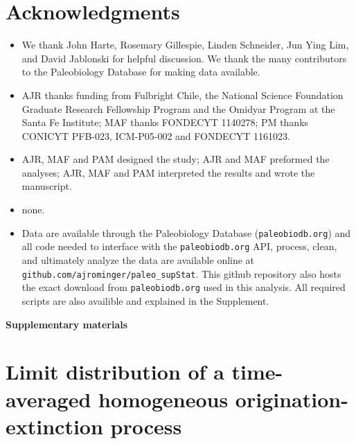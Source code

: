 \documentclass[12pt]{article}
\begin{document}
\section*{Acknowledgments}
\begin{itemize}
\item[{\bf General:}] We thank John Harte, Rosemary Gillespie, Linden
  Schneider, Jun Ying Lim, and David Jablonski for helpful
  discussion. We thank the many contributors to the Paleobiology
  Database for making data available.
\item[{\bf Funding:}] AJR thanks funding from Fulbright Chile, the
  National Science Foundation Graduate Research Fellowship Program and
  the Omidyar Program at the Santa Fe Institute; MAF thanks FONDECYT
  1140278; PM thanks CONICYT PFB-023, ICM-P05-002 and FONDECYT
  1161023.
\item[{\bf Author contributions:}] AJR, MAF and PAM designed the
  study; AJR and MAF preformed the analyses; AJR, MAF and PAM
  interpreted the results and wrote the manuscript.
\item[{\bf Competing interests:}] none.
\item[{\bf Data and materials availability:}] Data are available
  through the Paleobiology Database ({\tt paleobiodb.org}) and all
  code needed to interface with the {\tt paleobiodb.org} API, process,
  clean, and ultimately analyze the data are available online at {\tt
    github.com/ajrominger/paleo\_supStat}. This github repository also
  hosts the exact download from {\tt paleobiodb.org} used in this
  analysis. All required scripts are also availible and explained in
  the Supplement.
\end{itemize}


\clearpage

\newcommand{\beginsupplement}{%
  \setcounter{table}{0}
  \renewcommand{\thetable}{S\arabic{table}}%
  \setcounter{figure}{0}
  \renewcommand{\thefigure}{S\arabic{figure}}%
  \setcounter{section}{0}
  \renewcommand{\thesection}{S\arabic{section}}%
}

\beginsupplement

\begin{center}
{\LARGE \bf Supplementary materials}
\end{center}
\vspace{2em}

\section{Limit distribution of a time-averaged homogeneous
  origination-extinction process}
\label{sec:suppLimitDist}
\end{document}

